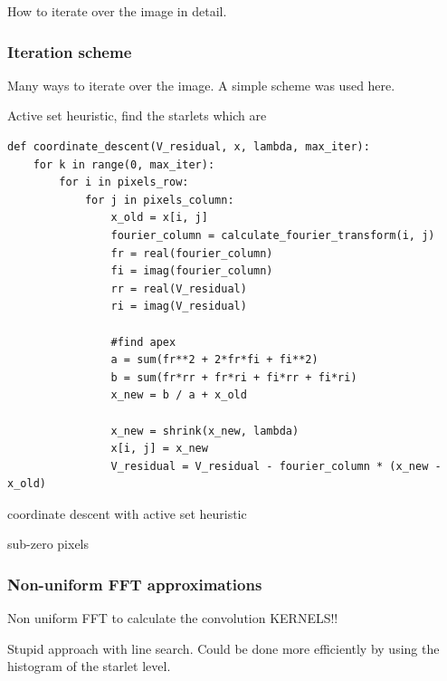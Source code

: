 How to iterate over the image in detail.

\subsubsection{Iteration scheme}
Many ways to iterate over the image. A simple scheme was used here. 

Active set heuristic, find the starlets which are 

\begin{lstlisting} 
def coordinate_descent(V_residual, x, lambda, max_iter):
	for k in range(0, max_iter):
		for i in pixels_row:
			for j in pixels_column:
				x_old = x[i, j]
				fourier_column = calculate_fourier_transform(i, j)
				fr = real(fourier_column)
				fi = imag(fourier_column)
				rr = real(V_residual)
				ri = imag(V_residual)
				
				#find apex
				a = sum(fr**2 + 2*fr*fi + fi**2)
				b = sum(fr*rr + fr*ri + fi*rr + fi*ri)
				x_new = b / a + x_old
				
				x_new = shrink(x_new, lambda)
				x[i, j] = x_new
				V_residual = V_residual - fourier_column * (x_new - x_old)
\end{lstlisting}\label{cd:implementation}

coordinate descent with active set heuristic


sub-zero pixels

\subsubsection{Non-uniform FFT approximations}
Non uniform FFT to calculate the convolution KERNELS!!


Stupid approach with line search. Could be done more efficiently by using the histogram of the starlet level.

